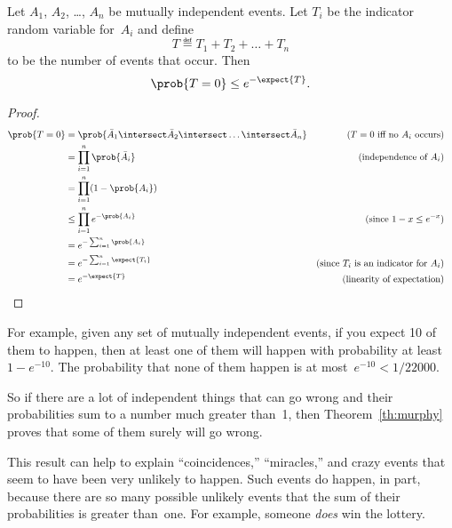 
\begin{theorem}\label{th:murphy}
Let $A_1$, $A_2$, \dots, $A_n$ be mutually independent events.  Let
$T_i$ be the indicator random variable for~$A_i$ and define
\begin{equation*}
    T \eqdef T_1 + T_2 + \dots + T_n
\end{equation*}
to be the number of events that occur.  Then
\begin{equation*}
    \prob{T = 0} \le e^{- \expect{T}}.
\end{equation*}
\end{theorem}

\begin{proof}
\begin{align*}
\prob{T = 0}
    &= \prob{ \bar{A}_1 \intersect \bar{A}_2 \intersect \dots
  \intersect \bar{A}_n } 
        & \text{($T=0$ iff no $A_i$ occurs)}\\
    &= \prod_{i = 1}^n \prob{\bar{A}_i}
        & \text{(independence of $A_i$)} \\
    &= \prod_{i = 1}^n (1 - \prob{A_i}) \\
    &\le \prod_{i = 1}^n e^{-\prob{A_i}}
        & \text{(since $1 - x \le e^{-x}$)} \\
    &= e^{-\sum_{i = 1}^n \prob{A_i}} \\
    &= e^{-\sum_{i = 1}^n \expect{T_i}} 
        & \text{(since $T_i$ is an indicator for $A_i$)} \\
    &= e^{-\expect{T}}
        & \text{(linearity of expectation)}
        & \qedhere
\end{align*}
\end{proof}

For example, given any set of mutually independent events, if you
expect 10 of them to happen, then at least one of them will happen
with probability at least~$1 - e^{-10}$.  The probability that none of
them happen is at most~$e^{-10} < 1/22000$.

So if there are a lot of independent things that can go wrong and their
probabilities sum to a number much greater than~1, then
Theorem~\ref{th:murphy} proves that some of them surely will go wrong.

This result can help to explain ``coincidences,'' ``miracles,'' and
crazy events that seem to have been very unlikely to happen.  Such
events do happen, in part, because there are so many possible unlikely
events that the sum of their probabilities is greater than~one.  For
example, someone \emph{does} win the lottery.


